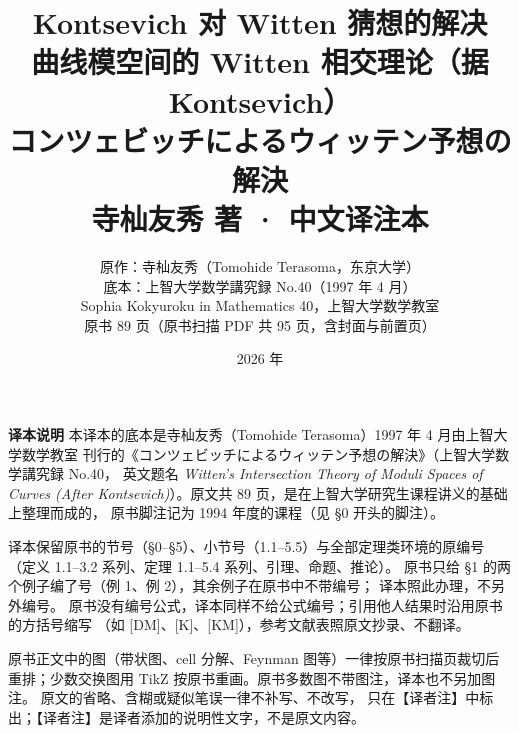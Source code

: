 

\title{\bfseries Kontsevich 对 Witten 猜想的解决\\[2pt]
  \large\mdseries 曲线模空间的 Witten 相交理论（据 Kontsevich）\\[8pt]
  \normalsize\mdseries コンツェビッチによるウィッテン予想の解決\\[2pt]
  \large\mdseries 寺杣友秀 著 · 中文译注本}
\author{原作：寺杣友秀（Tomohide Terasoma，东京大学）\\[2pt]
  \small 底本：上智大学数学講究録 No.40（1997 年 4 月）\\
  \small Sophia Kokyuroku in Mathematics 40，上智大学数学教室\\
  \small 原书 89 页（原书扫描 PDF 共 95 页，含封面与前置页）}
\date{2026 年}


\maketitle
\thispagestyle{empty}

\vspace{0.5em}
\begin{center}
\begin{minipage}{0.88\textwidth}
\small
\textbf{译本说明}\quad
本译本的底本是寺杣友秀（Tomohide Terasoma）1997 年 4 月由上智大学数学教室
刊行的《コンツェビッチによるウィッテン予想の解決》（上智大学数学講究録 No.40，
英文题名 \emph{Witten's Intersection Theory of Moduli Spaces of Curves (After
Kontsevich)}）。原文共 89 页，是在上智大学研究生课程讲义的基础上整理而成的，
原书脚注记为 1994 年度的课程（见 §0 开头的脚注）。

译本保留原书的节号（§0–§5）、小节号（1.1–5.5）与全部定理类环境的原编号
（定义 1.1–3.2 系列、定理 1.1–5.4 系列、引理、命题、推论）。
原书只给 §1 的两个例子编了号（例 1、例 2），其余例子在原书中不带编号；
译本照此办理，不另外编号。
原书没有编号公式，译本同样不给公式编号；引用他人结果时沿用原书的方括号缩写
（如 [DM]、[K]、[KM]），参考文献表照原文抄录、不翻译。

原书正文中的图（带状图、cell 分解、Feynman 图等）一律按原书扫描页裁切后
重排；少数交换图用 TikZ 按原书重画。原书多数图不带图注，译本也不另加图注。
原文的省略、含糊或疑似笔误一律不补写、不改写，
只在【译者注】中标出；【译者注】是译者添加的说明性文字，不是原文内容。
\end{minipage}
\end{center}

